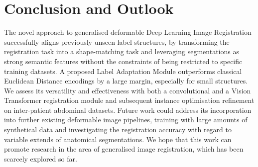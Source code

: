 \section{Conclusion and Outlook}
The novel approach to generalised deformable Deep Learning Image Registration successfully aligns previously unseen label structures, by transforming the registration task into a shape-matching task and leveraging segmentations as strong semantic features without the constraints of being restricted to specific training datasets. A proposed Label Adaptation Module outperforms classical Euclidean Distance encodings by a large margin, especially for small structures.  We assess its versatility and effectiveness with both a convolutional and a Vision Transformer registration module and subsequent instance optimisation refinement on inter-patient abdominal datasets. Future work could address its incorporation into further existing deformable image pipelines, training with large amounts of synthetical data and investigating the registration accuracy with regard to variable extends of anatomical segmentations. We hope that this work can promote research in the area of generalised image registration, which has been scarcely explored so far.